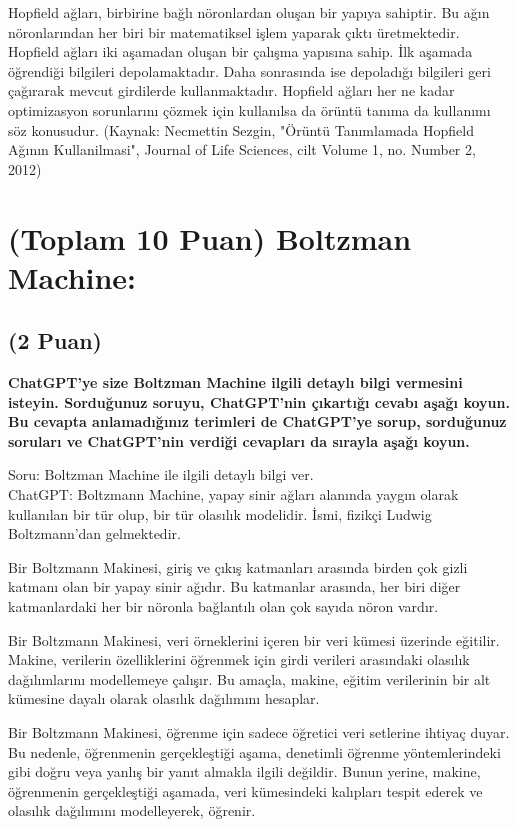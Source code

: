 \documentclass[11pt]{article}
\begin{document}
Hopfield ağları, birbirine bağlı nöronlardan oluşan bir yapıya sahiptir. Bu ağın nöronlarından her biri bir matematiksel işlem yaparak çıktı üretmektedir. Hopfield ağları iki aşamadan oluşan bir çalışma yapısına sahip. İlk aşamada öğrendiği bilgileri depolamaktadır. Daha sonrasında ise depoladığı bilgileri geri çağırarak mevcut girdilerde kullanmaktadır. 
Hopfield ağları her ne kadar optimizasyon sorunlarını çözmek için kullanılsa da örüntü tanıma da kullanımı söz konusudur. (Kaynak: Necmettin Sezgin, "Örüntü Tanımlamada Hopfield Ağının Kullanilmasi", Journal of Life Sciences, cilt Volume 1, no. Number 2, 2012)

\section{(Toplam 10 Puan) Boltzman Machine:}

\subsection{(2 Puan)} \textbf{ChatGPT’ye size Boltzman Machine ilgili detaylı bilgi vermesini isteyin. Sorduğunuz soruyu, ChatGPT'nin çıkartığı cevabı aşağı koyun. Bu cevapta anlamadığınız terimleri de ChatGPT’ye sorup, sorduğunuz soruları ve ChatGPT’nin verdiği cevapları da sırayla aşağı koyun.}

Soru: Boltzman Machine ile ilgili detaylı bilgi ver.\\

ChatGPT: Boltzmann Machine, yapay sinir ağları alanında yaygın olarak kullanılan bir tür olup, bir tür olasılık modelidir. İsmi, fizikçi Ludwig Boltzmann'dan gelmektedir.

Bir Boltzmann Makinesi, giriş ve çıkış katmanları arasında birden çok gizli katmanı olan bir yapay sinir ağıdır. Bu katmanlar arasında, her biri diğer katmanlardaki her bir nöronla bağlantılı olan çok sayıda nöron vardır.

Bir Boltzmann Makinesi, veri örneklerini içeren bir veri kümesi üzerinde eğitilir. Makine, verilerin özelliklerini öğrenmek için girdi verileri arasındaki olasılık dağılımlarını modellemeye çalışır. Bu amaçla, makine, eğitim verilerinin bir alt kümesine dayalı olarak olasılık dağılımını hesaplar.

Bir Boltzmann Makinesi, öğrenme için sadece öğretici veri setlerine ihtiyaç duyar. Bu nedenle, öğrenmenin gerçekleştiği aşama, denetimli öğrenme yöntemlerindeki gibi doğru veya yanlış bir yanıt almakla ilgili değildir. Bunun yerine, makine, öğrenmenin gerçekleştiği aşamada, veri kümesindeki kalıpları tespit ederek ve olasılık dağılımını modelleyerek, öğrenir.
\end{document}
